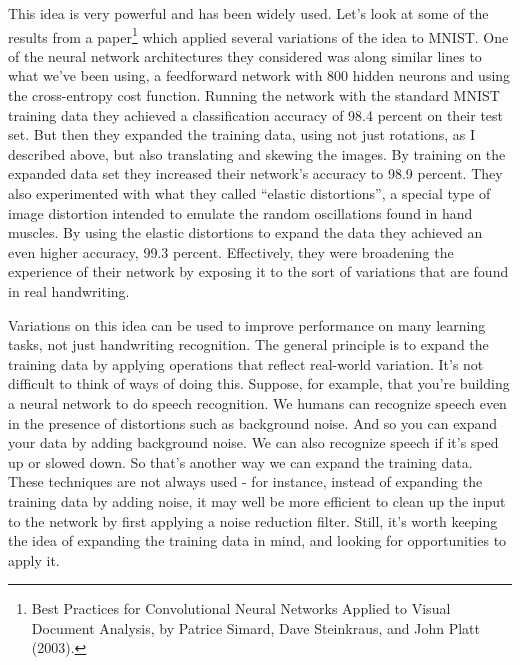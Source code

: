 \documentclass[a4paper,twoside,10pt]{book}
\begin{document}
This idea is very powerful and has been widely used. Let's look at some of the results from a paper\footnote{Best Practices for Convolutional Neural Networks Applied to Visual Document Analysis, by Patrice Simard, Dave Steinkraus, and John Platt (2003).} which applied several variations of the idea to MNIST. One of the neural network architectures they considered was along similar lines to what we've been using, a feedforward network with 800 hidden neurons and using the cross-entropy cost function. Running the network with the standard MNIST training data they achieved a classification accuracy of 98.4 percent on their test set. But then they expanded the training data, using not just rotations, as I described above, but also translating and skewing the images. By training on the expanded data set they increased their network's accuracy to 98.9 percent. They also experimented with what they called ``elastic distortions'', a special type of image distortion intended to emulate the random oscillations found in hand muscles. By using the elastic distortions to expand the data they achieved an even higher accuracy, 99.3 percent. Effectively, they were broadening the experience of their network by exposing it to the sort of variations that are found in real handwriting.

Variations on this idea can be used to improve performance on many learning tasks, not just handwriting recognition. The general principle is to expand the training data by applying operations that reflect real-world variation. It's not difficult to think of ways of doing this. Suppose, for example, that you're building a neural network to do speech recognition. We humans can recognize speech even in the presence of distortions such as background noise. And so you can expand your data by adding background noise. We can also recognize speech if it's sped up or slowed down. So that's another way we can expand the training data. These techniques are not always used - for instance, instead of expanding the training data by adding noise, it may well be more efficient to clean up the input to the network by first applying a noise reduction filter. Still, it's worth keeping the idea of expanding the training data in mind, and looking for opportunities to apply it.
\end{document}
